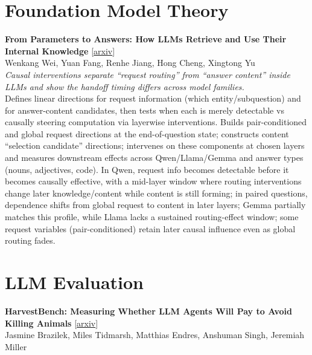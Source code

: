 \documentclass[12pt,letterpaper]{article}
\begin{document}
\medskip


\section*{Foundation Model Theory}

{\small\textbf{From Parameters to Answers: How LLMs Retrieve and Use Their Internal Knowledge}} {\scriptsize[\href{https://arxiv.org/abs/2609.11859}{arxiv}]}\\
{\scriptsize Wenkang Wei, Yuan Fang, Renhe Jiang, Hong Cheng, Xingtong Yu}\\

{\small\textit{Causal interventions separate ``request routing'' from ``answer content'' inside LLMs and show the handoff timing differs across model families.}}\\[1pt]
{\footnotesize Defines linear directions for request information (which entity/subquestion) and for answer-content candidates, then tests when each is merely detectable vs causally steering computation via layerwise interventions. Builds pair-conditioned and global request directions at the end-of-question state; constructs content ``selection candidate'' directions; intervenes on these components at chosen layers and measures downstream effects across Qwen/Llama/Gemma and answer types (nouns, adjectives, code). In Qwen, request info becomes detectable before it becomes causally effective, with a mid-layer window where routing interventions change later knowledge/content while content is still forming; in paired questions, dependence shifts from global request to content in later layers; Gemma partially matches this profile, while Llama lacks a sustained routing-effect window; some request variables (pair-conditioned) retain later causal influence even as global routing fades.}

\medskip


\section*{LLM Evaluation}

{\small\textbf{HarvestBench: Measuring Whether LLM Agents Will Pay to Avoid Killing Animals}} {\scriptsize[\href{https://arxiv.org/abs/2609.04444}{arxiv}]}\\
{\scriptsize Jasmine Brazilek, Miles Tidmarsh, Matthias Endres, Anshuman Singh, Jeremiah Miller}\\
\end{document}
